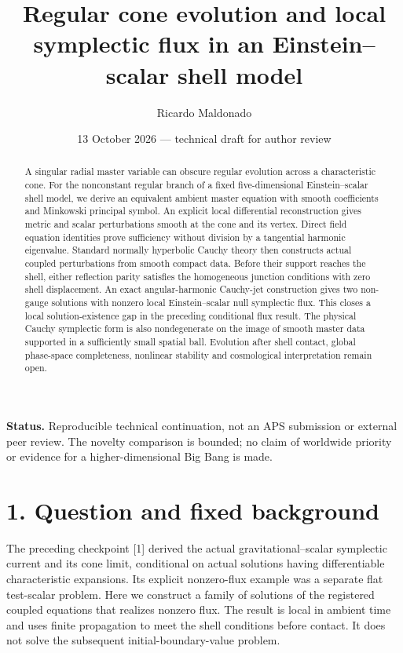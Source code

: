 \documentclass[
  10pt,
]{article}
\title{Regular cone evolution and local symplectic flux in an
Einstein--scalar shell model}
\author{Ricardo Maldonado}
\date{13 October 2026 --- technical draft for author review}
\begin{document}
\maketitle
\begin{abstract}
A singular radial master variable can obscure regular evolution across a
characteristic cone. For the nonconstant regular branch of a fixed
five-dimensional Einstein--scalar shell model, we derive an equivalent
ambient master equation with smooth coefficients and Minkowski principal
symbol. An explicit local differential reconstruction gives metric and
scalar perturbations smooth at the cone and its vertex. Direct field
equation identities prove sufficiency without division by a tangential
harmonic eigenvalue. Standard normally hyperbolic Cauchy theory then
constructs actual coupled perturbations from smooth compact data. Before
their support reaches the shell, either reflection parity satisfies the
homogeneous junction conditions with zero shell displacement. An exact
angular-harmonic Cauchy-jet construction gives two non-gauge solutions
with nonzero local Einstein--scalar null symplectic flux. This closes a
local solution-existence gap in the preceding conditional flux result.
The physical Cauchy symplectic form is also nondegenerate on the image
of smooth master data supported in a sufficiently small spatial ball.
Evolution after shell contact, global phase-space completeness,
nonlinear stability and cosmological interpretation remain open.
\end{abstract}

\textbf{Status.} Reproducible technical continuation, not an APS
submission or external peer review. The novelty comparison is bounded;
no claim of worldwide priority or evidence for a higher-dimensional Big
Bang is made.

\section{1. Question and fixed
background}\label{question-and-fixed-background}

The preceding checkpoint {[}1{]} derived the actual
gravitational--scalar symplectic current and its cone limit, conditional
on actual solutions having differentiable characteristic expansions. Its
explicit nonzero-flux example was a separate flat test-scalar problem.
Here we construct a family of solutions of the registered coupled
equations that realizes nonzero flux. The result is local in ambient
time and uses finite propagation to meet the shell conditions before
contact. It does not solve the subsequent initial-boundary-value
problem.
\end{document}
